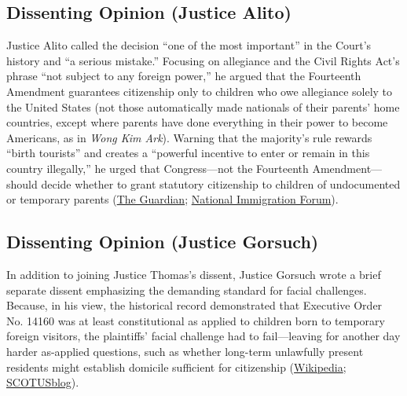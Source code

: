 \documentclass[12pt]{article}
\begin{document}
\subsection{Dissenting Opinion (Justice Alito)}
Justice Alito called the decision ``one of the most important'' in the Court's history and ``a serious mistake.'' Focusing on allegiance and the Civil Rights Act's phrase ``not subject to any foreign power,'' he argued that the Fourteenth Amendment guarantees citizenship only to children who owe allegiance solely to the United States (not those automatically made nationals of their parents' home countries, except where parents have done everything in their power to become Americans, as in \textit{Wong Kim Ark}). Warning that the majority's rule rewards ``birth tourists'' and creates a ``powerful incentive to enter or remain in this country illegally,'' he urged that Congress---not the Fourteenth Amendment---should decide whether to grant statutory citizenship to children of undocumented or temporary parents (\href{https://www.theguardian.com/us-news/2026/jun/30/birthright-citizenship-explained-supreme-court}{The Guardian}; \href{https://forumtogether.org/article/explainer-supreme-court-reaffirms-birthright-citizenship-in-trump-v-barbara/}{National Immigration Forum}).

\subsection{Dissenting Opinion (Justice Gorsuch)}
In addition to joining Justice Thomas's dissent, Justice Gorsuch wrote a brief separate dissent emphasizing the demanding standard for facial challenges. Because, in his view, the historical record demonstrated that Executive Order No. 14160 was at least constitutional as applied to children born to temporary foreign visitors, the plaintiffs' facial challenge had to fail---leaving for another day harder as-applied questions, such as whether long-term unlawfully present residents might establish domicile sufficient for citizenship (\href{https://en.wikipedia.org/wiki/Trump_v._Barbara}{Wikipedia}; \href{https://www.scotusblog.com/2026/06/breaking-down-the-birthright-citizenship-decision/}{SCOTUSblog}).
\end{document}
